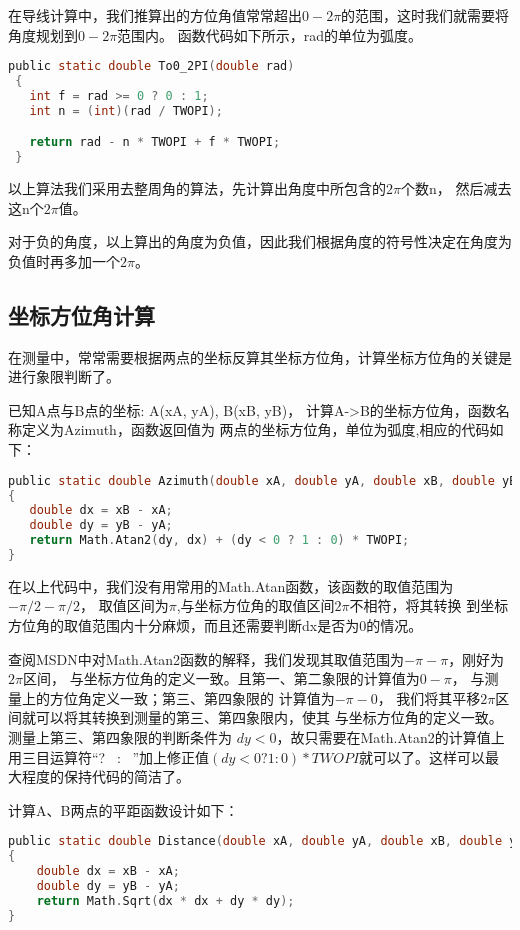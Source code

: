 在导线计算中，我们推算出的方位角值常常超出$0 -2\pi$的范围，这时我们就需要将角度规划到$0 -2\pi$范围内。
函数代码如下所示，rad的单位为弧度。

\begin{lstlisting}[language=C]
 public static double To0_2PI(double rad)
 {
   int f = rad >= 0 ? 0 : 1;
   int n = (int)(rad / TWOPI);

   return rad - n * TWOPI + f * TWOPI;
 }
 \end{lstlisting}

 以上算法我们采用去整周角的算法，先计算出角度中所包含的$2\pi$个数n，
 然后减去这n个$2\pi$值。

 对于负的角度，以上算出的角度为负值，因此我们根据角度的符号性决定在角度为负值时再多加一个$2\pi$。


\subsection{坐标方位角计算}

在测量中，常常需要根据两点的坐标反算其坐标方位角，计算坐标方位角的关键是进行象限判断了。

已知A点与B点的坐标: A(xA, yA), B(xB, yB)， 计算A->B的坐标方位角，函数名称定义为Azimuth，函数返回值为
两点的坐标方位角，单位为弧度,相应的代码如下：

\begin{lstlisting}[language=C]
public static double Azimuth(double xA, double yA, double xB, double yB)
{
   double dx = xB - xA;
   double dy = yB - yA;
   return Math.Atan2(dy, dx) + (dy < 0 ? 1 : 0) * TWOPI;
}
\end{lstlisting}

在以上代码中，我们没有用常用的Math.Atan函数，该函数的取值范围为$-\pi /2 - \pi/2$，
取值区间为$\pi$,与坐标方位角的取值区间$2\pi$不相符，将其转换
到坐标方位角的取值范围内十分麻烦，而且还需要判断dx是否为0的情况。

查阅MSDN中对Math.Atan2函数的解释，我们发现其取值范围为$-\pi - \pi$，刚好为$2\pi$区间，
与坐标方位角的定义一致。且第一、第二象限的计算值为$0-\pi$， 与测量上的方位角定义一致；第三、第四象限的
计算值为$-\pi - 0$， 我们将其平移$2\pi$区间就可以将其转换到测量的第三、第四象限内，使其
与坐标方位角的定义一致。测量上第三、第四象限的判断条件为 $dy<0$，故只需要在Math.Atan2的计算值上
用三目运算符``?~ : ~''加上修正值$(dy < 0 ? 1 : 0) * TWOPI$就可以了。这样可以最大程度的保持代码的简洁了。

计算A、B两点的平距函数设计如下：
\begin{lstlisting}[language=C]
public static double Distance(double xA, double yA, double xB, double yB)
{
    double dx = xB - xA;
    double dy = yB - yA;
    return Math.Sqrt(dx * dx + dy * dy);
}
\end{lstlisting}

